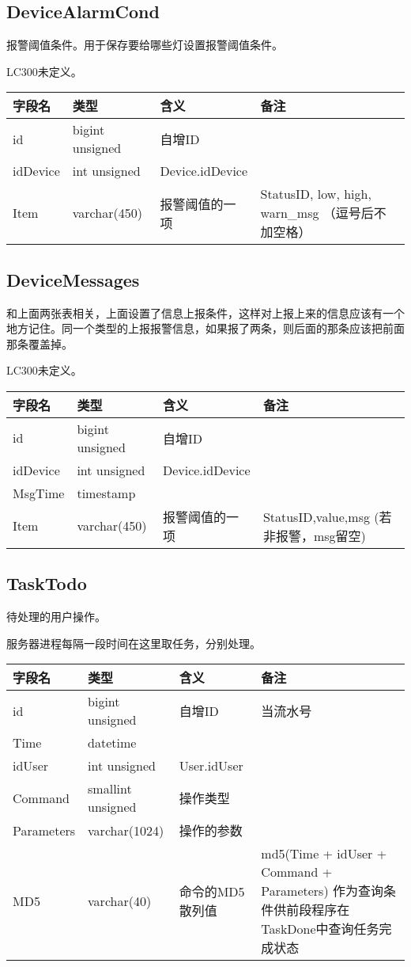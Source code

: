 \subsection{DeviceAlarmCond}\label{devicealarmcond}

报警阈值条件。用于保存要给哪些灯设置报警阈值条件。

LC300未定义。

\begin{longtabu}[c]{@{}lXXX@{}}
\toprule
字段名 & 类型 & 含义 & 备注\tabularnewline
\midrule
\endhead
id & bigint unsigned & 自增ID &\tabularnewline
idDevice & int unsigned & Device.idDevice &\tabularnewline
Item & varchar(450) & 报警阈值的一项 & StatusID, low, high, warn\_msg
（逗号后不加空格）\tabularnewline
\bottomrule
\end{longtabu}

\subsection{DeviceMessages}\label{devicemessages}

和上面两张表相关，上面设置了信息上报条件，这样对上报上来的信息应该有一个地方记住。同一个类型的上报报警信息，如果报了两条，则后面的那条应该把前面那条覆盖掉。

LC300未定义。

\begin{longtabu}[c]{@{}lXXX@{}}
\toprule
字段名 & 类型 & 含义 & 备注\tabularnewline
\midrule
\endhead
id & bigint unsigned & 自增ID &\tabularnewline
idDevice & int unsigned & Device.idDevice &\tabularnewline
MsgTime & timestamp & &\tabularnewline
Item & varchar(450) & 报警阈值的一项 & StatusID,value,msg
(若非报警，msg留空)\tabularnewline
\bottomrule
\end{longtabu}

\subsection{TaskTodo}\label{tasktodo}

待处理的用户操作。

服务器进程每隔一段时间在这里取任务，分别处理。

\begin{longtabu}[c]{@{}lXXX@{}}
\toprule
字段名 & 类型 & 含义 & 备注\tabularnewline
\midrule
\endhead
id & bigint unsigned & 自增ID & 当流水号\tabularnewline
Time & datetime & &\tabularnewline
idUser & int unsigned & User.idUser &\tabularnewline
Command & smallint unsigned & 操作类型 &\tabularnewline
Parameters & varchar(1024) & 操作的参数 &\tabularnewline
MD5 & varchar(40) & 命令的MD5散列值 & md5(Time + idUser + Command +
Parameters)
作为查询条件供前段程序在TaskDone中查询任务完成状态\tabularnewline
\bottomrule
\end{longtabu}

